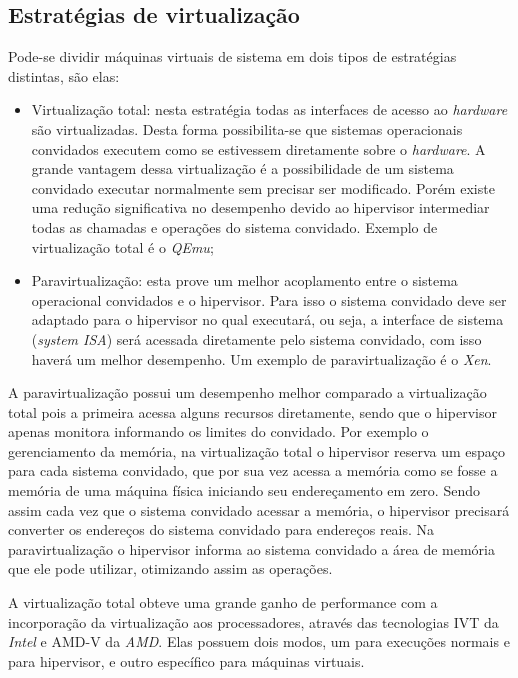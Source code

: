 \subsection{Estratégias de virtualização}
\label{section:virtestrat}

Pode-se dividir máquinas virtuais de sistema em dois tipos de estratégias distintas, são elas:

\begin{itemize}
 \item Virtualização total: nesta estratégia todas as interfaces de acesso ao \textit{hardware} são virtualizadas. Desta forma
 possibilita-se que sistemas operacionais convidados executem como se estivessem diretamente sobre o \textit{hardware}. A grande
 vantagem dessa virtualização é a possibilidade de um sistema convidado executar normalmente sem precisar ser modificado. Porém
 existe uma redução significativa no desempenho devido ao hipervisor intermediar todas as chamadas e operações do sistema convidado.
 Exemplo de virtualização total é o \textit{QEmu};
 \item Paravirtualização: esta prove um melhor acoplamento entre o sistema operacional convidados e o hipervisor. Para isso o sistema
 convidado deve ser adaptado para o hipervisor no qual executará, ou seja, a interface de sistema (\textit{system ISA}) será acessada
 diretamente pelo sistema convidado, com isso haverá um melhor desempenho. Um exemplo de paravirtualização é o \textit{Xen}.
\end{itemize}

A paravirtualização possui um desempenho melhor comparado a virtualização total pois a primeira acessa alguns recursos diretamente, 
sendo que o hipervisor apenas monitora informando os limites do convidado. Por exemplo o gerenciamento da memória, na virtualização total
o hipervisor reserva um espaço para cada sistema convidado, que por sua vez acessa a memória como se fosse a memória de uma máquina física
iniciando seu endereçamento em zero. Sendo assim cada vez que o sistema convidado acessar a memória, o hipervisor precisará
converter os endereços do sistema convidado para endereços reais. Na paravirtualização o hipervisor informa ao sistema 
convidado a área de memória que ele pode utilizar, otimizando assim as operações.

A virtualização total obteve uma grande ganho de performance com a incorporação da virtualização aos processadores, através das 
tecnologias \ac{IVT} da \textit{Intel} e \ac{AMD-V} da \textit{AMD}. Elas possuem dois modos, um para execuções normais e para hipervisor, 
e outro específico para máquinas virtuais. 

